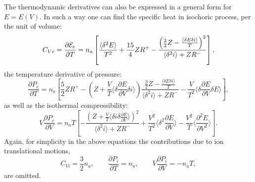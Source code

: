 The thermodynamic derivatives can also be expressed in a general form for $E=E(V)$.
In such a way one can find the specific heat in isochoric process, per the unit of volume:
\begin{equation}\label{generalCv}
C_{Ve}=\frac{\partial {\cal E}_e}{\partial T}=n_a\left[\frac{\langle\delta^2 E \rangle}{T^2}+\frac{15}4ZR^+
-\frac{\left(\frac32Z-\frac{\langle\delta E \delta i\rangle}T\right)^2}{\langle\delta^2i\rangle+ZR^-}\right],
\end{equation}
the temperature derivative of pressure:
\begin{equation}\label{generalPT}
\frac {\partial P_e}{\partial T}=
n_a\left[
	\frac52 Z R^+ -
	\left( Z+\frac{V}{T} \langle \delta \frac{\partial E}{\partial V} \delta i \rangle \right)
		\frac{\frac32Z-\frac{\langle\delta E \delta i\rangle}T}{\langle\delta^2i\rangle+ZR^-} -
	\frac{V}{T^2} \langle \delta \frac{\partial E}{\partial V} \delta E \rangle
\right],
\end{equation}
as well as the isothermal compressibility:
\begin{equation}\label{generalCompr}
V\frac{\partial P_e}{\partial V}=
n_a T \left[ -\frac{\left(Z + \frac{V}{T} \langle \delta i \delta \frac{\partial E}{\partial V} \rangle \right)^2}
{\langle \delta^2 i \rangle + ZR^-} +
\frac{V^2}{T^2} \langle \delta^2 \frac{\partial E}{\partial V} \rangle -
\frac{V^2}{T} \langle \frac{\partial^2 E}{\partial V^2} \rangle
\right].
\end{equation}
Again, for simplicity in the above equations the contributions due to ion translational motions,
\begin{equation}
C_{Vi}=\frac32n_a, \qquad
\frac{\partial P_i}{\partial T}=n_a, \qquad
V\frac{\partial P_i}{\partial V}=-n_aT,
\end{equation}
are omitted.

